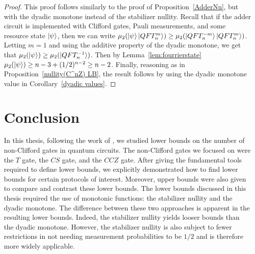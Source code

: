 \documentclass[12pt]{dalthesis}
\begin{document}
\begin{proof}
This proof follows similarly to the proof of Proposition~\ref{AdderNu}, but with the dyadic monotone instead of the stabilizer nullity. Recall that if the adder circuit is implemented with Clifford gates, Pauli measurements, and some resource state $\ket{\psi}$, then we can write $\mu_2 (\ket{\psi} \ket{QFT_n^m}) \geq \mu_2(\ket{QFT_n^{-m}} \ket{QFT_n^m})$. Letting $m=1$ and using the additive property of the dyadic monotone, we get that $\mu_2 (\ket{\psi}) \geq \mu_2(\ket{QFT_n^{-1}})$. Then by Lemma~\ref{lem:fourrierstate} $\mu_2 (\ket{\psi}) \geq n - 3 + (1/2)^{n-2} \geq n-2$. Finally, reasoning as in Proposition~\ref{nullity(C^nZ) LB}, the result follows by using the dyadic monotone value in Corollary~\ref{dyadic values}.

\end{proof}

\chapter{Conclusion}
\label{Conclusion}
In this thesis, following the work of \cite{beverland2019lower}, we studied lower bounds on the number of non-Clifford gates in quantum circuits. The non-Clifford gates we focused on were the $T$ gate, the $CS$ gate, and the $CCZ$ gate. After giving the fundamental tools required to define lower bounds, we explicitly demonstrated how to find lower bounds for certain protocols of interest. Moreover, upper bounds were also given to compare and contrast these lower bounds. The lower bounds discussed in this thesis required the use of monotonic functions: the stabilizer nullity and the dyadic monotone.  The difference between these two approaches is apparent in the resulting lower bounds. Indeed, the stabilizer nullity yields looser  bounds than the dyadic monotone. However, the stabilizer nullity is also subject to fewer restrictions in not needing measurement probabilities to be $1/2$ and is therefore more widely applicable.
\end{document}
